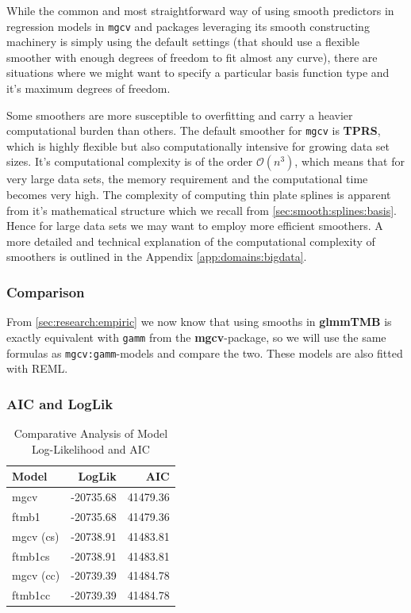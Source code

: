 \documentclass[12pt, twoside,hidelinks]{article}
\theoremstyle{definition}
\numberwithin{equation}{section}
\begin{document}
While the common and most straightforward way of using smooth predictors in regression models in \texttt{mgcv} and packages leveraging its smooth constructing machinery is simply using the default settings (that should use a flexible smoother with enough degrees of freedom to fit almost any curve), there are situations where we might want to specify a particular basis function type and it's maximum degrees of freedom. 
\newline

Some smoothers are more susceptible to overfitting and carry a heavier computational burden than others. The default smoother for \texttt{mgcv} is \textbf{TPRS}, which is highly flexible but also computationally intensive for growing data set sizes. It's computational complexity is of the order \(\mathcal{O}(n^3)\), which means that for very large data sets, the memory requirement and the computational time becomes very high. The complexity of computing thin plate splines is apparent from it's mathematical structure which we recall from \ref{sec:smooth:splines:basis}. Hence for large data sets we may want to employ more efficient smoothers. A more detailed and technical explanation of the computational complexity of smoothers is outlined in the Appendix \ref{app:domains:bigdata}.

\subsubsection{Comparison}\label{sec:research:optimizing:compare}

From \ref{sec:research:empiric} we now know that using smooths in \textbf{glmmTMB} is exactly equivalent with \texttt{gamm} from the \textbf{mgcv}-package, so we will use the same formulas as \texttt{mgcv:gamm}-models and compare the two. These models are also fitted with REML.


\subsubsection*{AIC and LogLik}

\begin{table}[H]
\centering
\begin{tabular}{lrr}
\hline
Model & LogLik & AIC \\ 
\hline
mgcv & -20735.68 & 41479.36 \\ 
ftmb1 & -20735.68 & 41479.36 \\ 
mgcv (cs) & -20738.91 & 41483.81 \\ 
ftmb1cs & -20738.91 & 41483.81 \\ 
mgcv (cc) & -20739.39 & 41484.78 \\ 
ftmb1cc & -20739.39 & 41484.78 \\ 
\hline
\end{tabular}
\caption{Comparative Analysis of Model Log-Likelihood and AIC}
\label{table:models_comparison}
\end{table}
\end{document}
